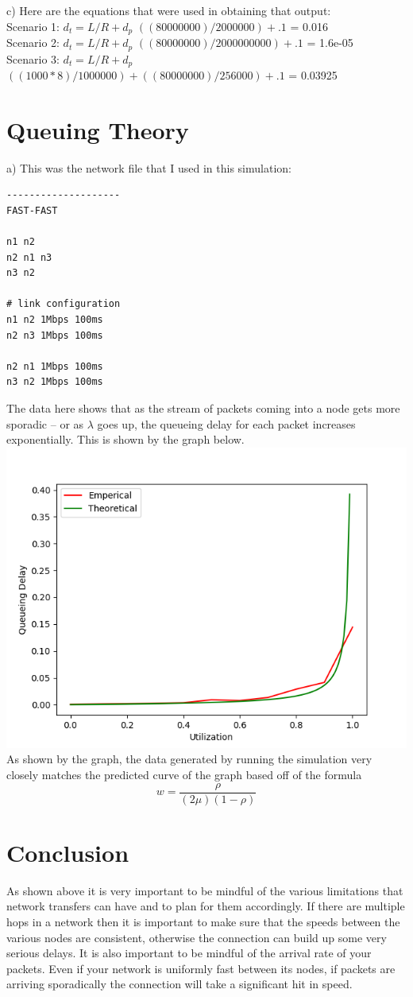 \documentclass[a4paper,11pt]{article}
\begin{document}
c) Here are the equations that were used in obtaining that output:\\
Scenario 1: $d_t = L/R+d_p$ $((80000000)/2000000) + .1$ = 0.016\\
Scenario 2: $d_t = L/R+d_p$ $((80000000)/2000000000) + .1$ = 1.6e-05\\
Scenario 3: $d_t = L/R+d_p$ $((1000*8)/1000000) + ((80000000)/256000) + .1$ = 0.03925\\

\section*{Queuing Theory}
a) This was the network file that I used in this simulation:
\begin{verbatim}
--------------------
FAST-FAST

n1 n2 
n2 n1 n3 
n3 n2

# link configuration
n1 n2 1Mbps 100ms
n2 n3 1Mbps 100ms

n2 n1 1Mbps 100ms
n3 n2 1Mbps 100ms
\end{verbatim}
The data here shows that as the stream of packets coming into a node gets more sporadic -- or as $\lambda$ goes up, the queueing delay for each packet increases exponentially. This is shown by the graph below.\\
\includegraphics{graph}
As shown by the graph, the data generated by running the simulation very closely matches the predicted curve of the graph based off of the formula \[w = \frac{\rho}{(2\mu)(1-\rho)}\]  

\section*{Conclusion}
As shown above it is very important to be mindful of the various limitations that network transfers can have and to plan for them accordingly. If there are multiple hops in a network then it is important to make sure that the speeds between the various nodes are consistent, otherwise the connection can build up some very serious delays. It is also important to be mindful of the arrival rate of your packets. Even if your network is uniformly fast between its nodes, if packets are arriving sporadically the connection will take a significant hit in speed.
\end{document}
